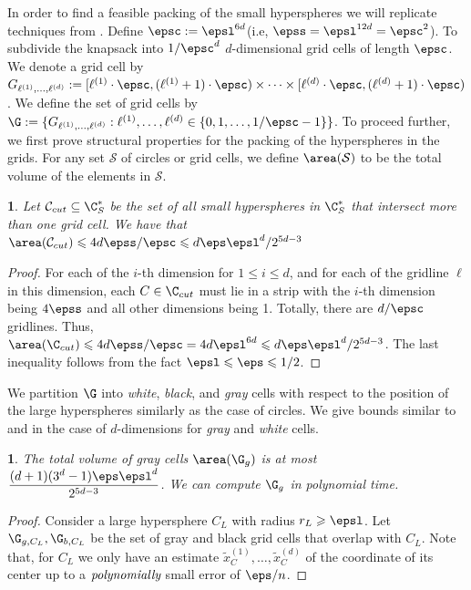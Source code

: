 \documentclass[10pt,a4paper]{article}
\theoremstyle{plain}
\theoremstyle{plain}
\newtheorem{lem}[theorem]{\protect\lemmaname}
\theoremstyle{plain}
\theoremstyle{definition}
\providecommand{\lemmaname}{Lemma}
\begin{document}
{	In order to find a feasible packing of the small hyperspheres we will replicate techniques from .  Define \(\epsc:=\epsl^{6d}\)(i.e, \(\epss=\epsl^{12d}=\epsc^2\)). To subdivide the knapsack into \(1/\epsc^d\) $d$-dimensional grid cells of length \(\epsc\). We denote a grid cell by \(G_{\ell^{(1)},\dots,\ell^{(d)}}:=[\ell^{(1)}\cdot\epsc,(\ell^{(1)}+1)\cdot\epsc)\times\dots\times[\ell^{(d)}\cdot\epsc,(\ell^{(d)}+1)\cdot\epsc)\). We define the set of grid cells by \(\G:=\{G_{\ell^{(1)},\dots,\ell^{(d)}}:\ell^{(1)},\dots,\ell^{(d)}\in\{0,1,\dots,1/\epsc-1\}\}\). To proceed further, we first prove structural properties for the packing of the hyperspheres in the grids. For any set \(\mathcal{S}\) of circles or grid cells, we define \(\area(\mathcal{S})\) to be the total volume of the elements in \(\mathcal{S}\).
	\begin{lem}\label{lem:small-hypersphere-grid-cells}
		Let \(\mathcal{C}_{cut}\subseteq\C_{S}^{*}\) be the set of all small hyperspheres in \(\C_{S}^{*}\) that intersect more than one grid cell. We have that \(\area(\mathcal{C}_{cut})\leqslant4d\epss/\epsc\leqslant d\eps\epsl^d/2^{5d-3}\)
	\end{lem}
	\begin{proof}
		For each of the \(i\)-th dimension for \(1\leqslant i \leqslant d\), and for each of the gridline \(\ell\) in this dimension, each \(C\in\C_{cut}\) must lie in a strip with the \(i\)-th dimension being \(4\epss\) and all other dimensions being 1. Totally, there are \(d/\epsc\) gridlines. Thus, \(\area(\C_{cut})\leqslant4d\epss/\epsc=4d\epsl^{6d}\leqslant d\eps\epsl^d/2^{5d-3}\). The last inequality follows from the fact \(\epsl\leqslant \eps\leqslant 1/2\).
	\end{proof}
	We partition \(\G\) into \emph{white}, \emph{black}, and \emph{gray} cells with respect to the position of the large hyperspheres similarly as the case of circles. We give bounds similar to  and  in the case of $d$-dimensions for \emph{gray} and \emph{white} cells.
	\begin{lem}\label{lem:gray-circles-d}
		The total volume of gray cells \(\area(\G_{g})\) is at most \(\dfrac{(d+1)(3^d-1)\eps\epsl^d}{2^{5d-3}}\). We can compute \(\G_g\) in polynomial time.
	\end{lem}
	\begin{proof}
		Consider a large hypersphere \(C_L\) with radius \(r_L\geqslant\epsl\). Let \(\G_{g, C_L},\G_{b, C_L}\) be the set of gray and black grid cells that overlap with \(C_L\). Note that, for \(C_L\) we only have an estimate \(\tilde{x}_{C}^{(1)},\dots,\tilde{x}_{C}^{(d)}\) of the coordinate of its center up to a \(\emph{polynomially}\) small error of \(\eps/n\).
		

\end{proof}}
\end{document}
